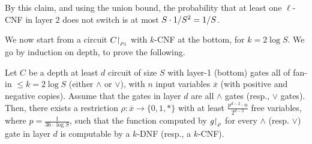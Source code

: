 By this claim, and using the union bound, the probability that at least one $\ell$-CNF in layer 2 does not switch is at most $ S\cdot 1/S^2 = 1/S$.



We now start from a circuit $C{\upharpoonright}_{\rho_1}$ with $k$-CNF at the bottom, for $k = 2 \log S$.
We go by induction on depth, to prove the following.


\begin{tcolorbox}[colframe=white, colback=red!11, boxrule=0mm, sharp corners]
\begin{lemma}\label{lem:induction-switch}
Let $C$ be a depth at least $d$ circuit of size $S$ 
with layer-1 (bottom) gates all of fan-in  $ \leq k=2 \log S$ (either  $\land$ or $\lor$),
with $n$ input variables  
$\overline x$ (with positive and negative copies). Assume that the gates in layer $d$ are all $\land$ gates (resp., $\lor$ gates). 
Then, there exists a restriction $\rho: \overline {x} \rightarrow\{0,1, *\} $ with at least  $\frac{p^{d-2} \cdot n}{2^{d-2}} $ free variables, where $ p=\frac{1}{36 \cdot \log S}$, such that  
the function computed by $g{\upharpoonright}_{\rho}$ for every $\land$ (resp. $\lor$) gate in layer $d$ is computable by a $k$-DNF (resp., a $k$-CNF). 
\end{lemma} 
\end{tcolorbox}

